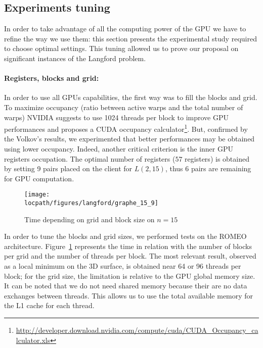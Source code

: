 \subsection{Experiments tuning}

In order to take advantage of all the computing power of the GPU we have to refine the way we use them: this section presents the experimental study required to choose optimal settings. This tuning allowed us to prove our proposal on significant instances of the Langford problem.

\paragraph{Registers, blocks and grid: }

In order to use all GPUs capabilities, the first way was to fill the blocks and grid. To maximize occupancy (ratio between active warps and the total number of warps) NVIDIA suggests to use 1024 threads per block to improve GPU performances and proposes a CUDA occupancy calculator\footnote{\url{http://developer.download.nvidia.com/compute/cuda/CUDA_Occupancy_calculator.xls}}. But, confirmed by the Volkov's results\cite{Volkov}, we experimented that better performances may be obtained using lower occupancy. Indeed, another critical criterion is the inner GPU registers occupation. 
The optimal number of registers ($57$ registers) is obtained by setting 9 pairs placed on the client for $L(2,15)$, thus 6 pairs are remaining for GPU computation.

\begin{figure}[t!]
\centering
\texttt{[image: \\locpath/figures/langford/graphe\_15\_9]}
\caption{Time depending on grid and block size on $n=15$}
\label{f7}
\end{figure}

In order to tune the blocks and grid sizes, we performed tests on the ROMEO architecture. 
Figure~\ref{f7} represents the time in relation with the number of blocks per grid and the number of threads per block. 
The most relevant result, observed as a local minimum on the 3D surface, is obtained near 64 or 96 threads per block; for the grid size, the limitation is relative to the GPU global memory size.
It can be noted that we do not need shared memory because their are no data exchanges between threads. 
This allows us to use the total available memory for the L1 cache for each thread.

